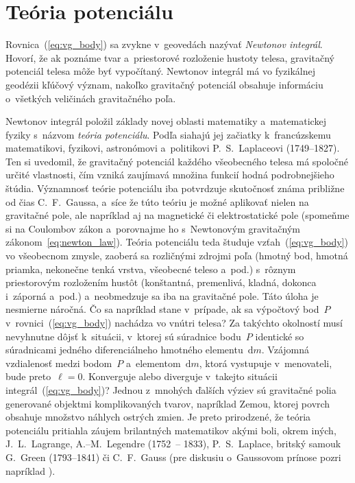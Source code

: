 \documentclass[a4paper, 12pt]{book}
\newcommand{\diff}{\mathrm d}
\begin{document}
\section{Teória potenciálu}
\label{sec:potential_theory}

Rovnica~(\ref{eq:vg_body}) sa zvykne v~geovedách nazývať \emph{Newtonov
integrál}.  Hovorí, že ak poznáme tvar a~priestorové rozloženie hustoty telesa,
gravitačný potenciál telesa môže byť vypočítaný.  Newtonov
integrál má vo fyzikálnej geodézii kľúčový význam, nakoľko gravitačný potenciál 
obsahuje informáciu o~všetkých veličinách gravitačného poľa.

Newtonov integrál položil základy novej oblasti matematiky a~matematickej 
fyziky s~názvom \emph{teória potenciálu}.  Podľa \textcite{MacMillan1930} 
siahajú jej začiatky k~francúzskemu matematikovi, fyzikovi, astronómovi 
a~politikovi P.~S.~Laplaceovi (1749--1827).  Ten si uvedomil, že gravitačný 
potenciál každého všeobecného telesa má spoločné určité vlastnosti, čím vzniká 
zaujímavá množina funkcií hodná podrobnejšieho štúdia.  Významnosť teórie 
potenciálu iba potvrdzuje skutočnosť známa približne od čias C.~F.~Gaussa, 
a~síce že túto teóriu je možné aplikovať nielen na gravitačné pole, ale 
napríklad aj na magnetické či elektrostatické pole (spomeňme si na Coulombov 
zákon a~porovnajme ho s~Newtonovým gravitačným zákonom~\ref{eq:newton_law}).  
Teória potenciálu teda študuje vzťah~(\ref{eq:vg_body}) vo všeobecnom zmysle, 
zaoberá sa rozličnými zdrojmi poľa (hmotný bod, hmotná priamka, nekonečne tenká 
vrstva, všeobecné teleso a~pod.) s~rôznym priestorovým rozložením hustôt 
(konštantná, premenlivá, kladná, dokonca i~záporná a~pod.) a~neobmedzuje sa iba 
na gravitačné pole.  Táto úloha je nesmierne náročná.  Čo sa napríklad stane 
v~prípade, ak sa výpočtový bod~$P$ v~rovnici~(\ref{eq:vg_body}) nachádza vo 
vnútri telesa?  Za takýchto okolností musí nevyhnutne dôjsť k~situácii, 
v~ktorej sú súradnice bodu~$P$ identické so súradnicami jedného diferenciálneho 
hmotného elementu~$\diff m$.  Vzájomná vzdialenosť medzi bodom~$P$ 
a~elementom~$\diff m$, ktorá vystupuje v~menovateli, bude preto~$\ell = 0$.  
Konverguje alebo diverguje v~takejto situácii integrál~(\ref{eq:vg_body})?  
Jednou z~mnohých ďalších výziev sú gravitačné polia generované objektmi 
komplikovaných tvarov, napríklad Zemou, ktorej povrch obsahuje množstvo náhlych 
ostrých zmien.  Je preto prirodzené, že teória potenciálu pritiahla záujem 
brilantných matematikov akými boli, okrem iných, J.~L.~Lagrange, 
A.--M.~Legendre (1752~-- 1833), P.~S.~Laplace, britský samouk G.~Green 
(1793--1841) či C.~F.~Gauss (pre diskusiu o~Gaussovom prínose pozri napríklad 
\cite{Freeden2018}).
\end{document}
